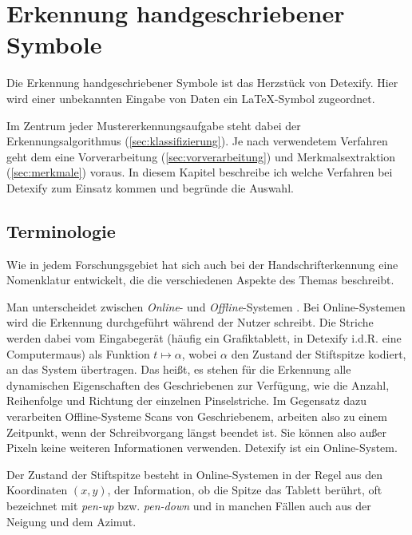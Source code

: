 

\chapter{Erkennung handgeschriebener Symbole} 

\label{cha:erkennung_handgeschriebener_symbole}

Die Erkennung handgeschriebener Symbole ist das Herzstück von Detexify. Hier wird einer unbekannten Eingabe von Daten ein \LaTeX-Symbol zugeordnet.

Im Zentrum jeder Mustererkennungsaufgabe steht dabei der Erkennungsalgorithmus (\ref{sec:klassifizierung}). Je nach verwendetem Verfahren geht dem eine Vorverarbeitung (\ref{sec:vorverarbeitung}) und Merkmalsextraktion (\ref{sec:merkmale}) voraus. In diesem Kapitel beschreibe ich welche Verfahren bei Detexify zum Einsatz kommen und begründe die Auswahl.

\section{Terminologie} 

\label{sec:terminologie}

Wie in jedem Forschungsgebiet hat sich auch bei der Handschrifterkennung eine Nomenklatur entwickelt, die die verschiedenen Aspekte des Themas beschreibt.

Man unterscheidet zwischen \emph{Online}- und \emph{Offline}-Systemen \cite{Tappert:1990p10302}. Bei Online-Systemen wird die Erkennung durchgeführt während der Nutzer schreibt. Die Striche werden dabei vom Eingabegerät (häufig ein Grafiktablett, in Detexify i.d.R. eine Computermaus) als Funktion \( t \mapsto \alpha \), wobei \( \alpha \) den Zustand der Stiftspitze kodiert, an das System übertragen. Das heißt, es stehen für die Erkennung alle dynamischen Eigenschaften des Geschriebenen zur Verfügung, wie die Anzahl, Reihenfolge und Richtung der einzelnen Pinselstriche. Im Gegensatz dazu verarbeiten Offline-Systeme Scans von Geschriebenem, arbeiten also zu einem Zeitpunkt, wenn der Schreibvorgang längst beendet ist. Sie können also außer Pixeln keine weiteren Informationen verwenden. Detexify ist ein Online-System.

Der Zustand der Stiftspitze besteht in Online-Systemen in der Regel aus den Koordinaten $(x,y)$, der Information, ob die Spitze das Tablett berührt, oft bezeichnet mit \emph{pen-up} bzw. \emph{pen-down} und in manchen Fällen auch aus der Neigung und dem Azimut.


